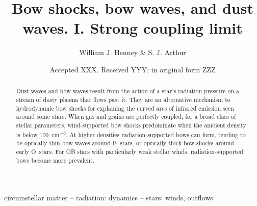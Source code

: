 \documentclass[useAMS, usenatbib, a4paper]{mnras}
\title
{Bow shocks, bow waves, and dust waves. I. Strong coupling limit}
\author[Henney \& Arthur]{
  William J. Henney \& S. J. Arthur\\
  \AddressCRyA
}
\date{Accepted XXX. Received YYY; in original form ZZZ}
\begin{document}
\label{firstpage}
\pagerange{\pageref{firstpage}--\pageref{lastpage}}
\maketitle
\begin{abstract}
  Dust waves and bow waves result from the action of a star's
  radiation pressure on a stream of dusty plasma that flows past it.
  They are an alternative mechanism to hydrodynamic bow shocks for
  explaining the curved arcs of infrared emission seen around some
  stars.  When gas and grains are perfectly coupled, for a broad class
  of stellar parameters, wind-supported bow shocks predominate when
  the ambient density is below \SI{100}{cm^{-3}}.  At higher densities
  radiation-supported bows can form, tending to be optically thin bow
  waves around B~stars, or optically thick bow shocks around early
  O~stars.  For OB stars with particularly weak stellar winds,
  radiation-supported bows become more prevalent.
\end{abstract}

\begin{keywords}
  circumstellar matter -- radiation: dynamics -- stars: winds, outflows
\end{keywords}






\bsp	%
\label{lastpage}
\end{document}
